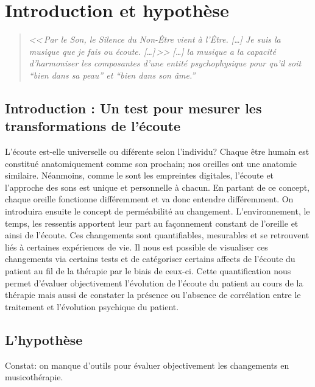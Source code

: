 \chapter{Introduction et hypothèse}

\label{jeSuisLaMusique:viret}
\begin{quotation}
\emph{<<\,\emph{Par le Son, le Silence du Non-Être vient à l'Être}. [\dots] 
\textsl{Je suis}
	\emph{la musique que je fais ou écoute}. [\dots]\,>>
[\ldots] \emph{la musique a la capacité d'harmoniser
les composantes d'une entité psychophysique pour qu'il soit ``bien
dans sa peau'' et ``bien dans son âme.}''}\, \autocite[ch. 1,  p. 8]{viret:b}
\end{quotation}





\section{Introduction : Un test pour mesurer les trans\-for\-ma\-tions de l'écoute}

L'écoute est-elle universelle ou diférente selon l'individu?
 Chaque être humain est constitué anatomiquement comme son prochain;
 nos oreilles ont  une anatomie similaire. Néanmoins, comme le sont 
les empreintes digitales, l'écoute et l'approche des sons est unique
et personnelle à chacun. En partant de ce concept, chaque oreille
fonctionne différemment et va donc entendre différemment. On
introduira ensuite le concept de perméabilité au
changement. L'environnement, le temps, les ressentis apportent leur
part au façonnement constant de l'oreille et ainsi de l'écoute. Ces
changements sont quantifiables, mesurables et se retrouvent liés à
certaines expériences de vie. Il nous est possible de visualiser ces
changements via certains tests et de catégoriser certains affects de
l'écoute du patient au fil de la thérapie par le biais de
ceux-ci. Cette quantification nous permet d'évaluer objectivement
l'évolution de l'écoute du patient au cours de la thérapie  mais aussi
de constater la présence ou l'absence de corrélation entre le
traitement et l'évolution psychique du patient.



\section{L'hypothèse}


   Constat: on manque d'outils pour évaluer objectivement les changements
en musicothérapie.


